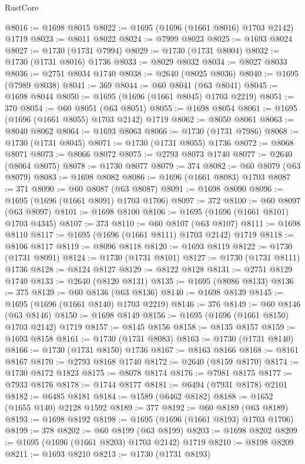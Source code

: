 \begin{lexlean}{RustCore}
\begin{coremodule}
@8016 := @1698 @8015
@8022 := @1695 (@1696 (@1661 @8016) @1703 @2142) @1719
@8023 := @8011 @8022
@8024 := @7999 @8023
@8025 := @1693 @8024
@8027 := @1730 (@1731 @7994)
@8029 := @1730 (@1731 @8004)
@8032 := @1730 (@1731 @8016) @1736
@8033 := @8029 @8032
@8034 := @8027 @8033
@8036 := @2751 @8034 @1740
@8038 := @2640 (@8025 @8036)
@8040 := @1695 (@7989 @8038)
@8041 := 369
@8044 := @60 @8041 (@63 @8041)
@8045 := @1698 @8044
@8050 := @1695 (@1696 (@1661 @8045) @1703 @2219)
@8051 := 370
@8054 := @60 @8051 (@63 @8051)
@8055 := @1698 @8054
@8061 := @1695 (@1696 (@1661 @8055) @1703 @2142) @1719
@8062 := @8050 @8061
@8063 := @8040 @8062
@8064 := @1693 @8063
@8066 := @1730 (@1731 @7986)
@8068 := @1730 (@1731 @8045)
@8071 := @1730 (@1731 @8055) @1736
@8072 := @8068 @8071
@8073 := @8066 @8072
@8075 := @2793 @8073 @1740
@8077 := @2640 (@8064 @8075)
@8078 := @1730 @8077
@8079 := 374
@8082 := @60 @8079 (@63 @8079)
@8083 := @1698 @8082
@8086 := @1696 (@1661 @8083) @1703
@8087 := 371
@8090 := @60 @8087 (@63 @8087)
@8091 := @1698 @8090
@8096 := @1695 (@1696 (@1661 @8091) @1703 @1706)
@8097 := 372
@8100 := @60 @8097 (@63 @8097)
@8101 := @1698 @8100
@8106 := @1695 (@1696 (@1661 @8101) @1703 @4345)
@8107 := 373
@8110 := @60 @8107 (@63 @8107)
@8111 := @1698 @8110
@8117 := @1695 (@1696 (@1661 @8111) @1703 @2142) @1719
@8118 := @8106 @8117
@8119 := @8096 @8118
@8120 := @1693 @8119
@8122 := @1730 (@1731 @8091)
@8124 := @1730 (@1731 @8101)
@8127 := @1730 (@1731 @8111) @1736
@8128 := @8124 @8127
@8129 := @8122 @8128
@8131 := @2751 @8129 @1740
@8133 := @2640 (@8120 @8131)
@8135 := @1695 (@8086 @8133)
@8136 := 375
@8139 := @60 @8136 (@63 @8136)
@8140 := @1698 @8139
@8145 := @1695 (@1696 (@1661 @8140) @1703 @2219)
@8146 := 376
@8149 := @60 @8146 (@63 @8146)
@8150 := @1698 @8149
@8156 := @1695 (@1696 (@1661 @8150) @1703 @2142) @1719
@8157 := @8145 @8156
@8158 := @8135 @8157
@8159 := @1693 @8158
@8161 := @1730 (@1731 @8083)
@8163 := @1730 (@1731 @8140)
@8166 := @1730 (@1731 @8150) @1736
@8167 := @8163 @8166
@8168 := @8161 @8167
@8170 := @2793 @8168 @1740
@8172 := @2640 (@8159 @8170)
@8174 := @1730 @8172 @1823
@8175 := @8078 @8174
@8176 := @7981 @8175
@8177 := @7933 @8176
@8178 := @1744 @8177
@8181 := @6494 (@7931 @8178) @2101
@8182 := @6485 @8181
@8184 := @1589 (@6462 @8182)
@8188 := @1652 (@1655 @140) @2128 @1592
@8189 := 377
@8192 := @60 @8189 (@63 @8189)
@8193 := @1698 @8192
@8198 := @1695 (@1696 (@1661 @8193) @1703 @1706)
@8199 := 378
@8202 := @60 @8199 (@63 @8199)
@8203 := @1698 @8202
@8209 := @1695 (@1696 (@1661 @8203) @1703 @2142) @1719
@8210 := @8198 @8209
@8211 := @1693 @8210
@8213 := @1730 (@1731 @8193)

\end{coremodule}
\end{lexlean}

